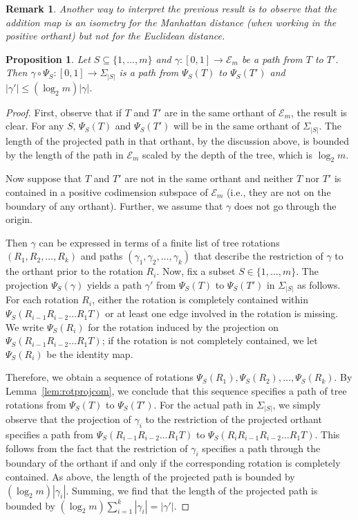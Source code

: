 \documentclass[a4paper,11pt]{article}
\newtheorem{proposition}[theorem]{Proposition}
\newtheorem{remark}[theorem]{Remark}
\newcommand{\aE}{\mathcal{E}}
\begin{document}
\begin{remark}
Another way to interpret the previous result is to observe that the addition map is an isometry for the Manhattan distance (when working in the positive orthant) but not for the Euclidean distance.
\end{remark}

\begin{proposition}\label{prop:projcont}
Let $S \subseteq \{1,\ldots,m\}$ and $\gamma \colon [0,1] \to \aE_m$ be a path from $T$ to $T'$.
Then $\gamma \circ \Psi_S \colon [0,1] \to \Sigma_{|S|}$ is a path from $\Psi_S(T)$ to $\Psi_S(T')$ and $|\gamma'| \leq (\log_2 m) |\gamma|$.
\end{proposition}

\begin{proof}
First, observe that if $T$ and $T'$ are in the same orthant of $\aE_m$, the result is clear. 
For any $S$, $\Psi_S(T)$ and $\Psi_S(T')$ will be in the same orthant of $\Sigma_{|S|}$.
The length of the projected path in that orthant, by the discussion above, is bounded by the length of the path in $\aE_m$ scaled by the depth of the tree, which is $\log_2 m$.

Now suppose that $T$ and $T'$ are not in the same orthant and neither $T$ nor $T'$ is contained in a positive codimension subspace of $\aE_m$ (i.e., they are not on the boundary of any orthant).
Further, we assume that $\gamma$ does not go through the origin.

Then $\gamma$ can be expressed in terms of a finite list of tree rotations $(R_1, R_2, \ldots, R_k)$ and paths $(\gamma_1, \gamma_2, \ldots, \gamma_k)$ that describe the restriction of $\gamma$ to the orthant prior to the rotation $R_i$.
Now, fix a subset $S \in \{1,\ldots,m\}$.
The projection $\Psi_S(\gamma)$ yields a path $\gamma'$ from $\Psi_S(T)$ to $\Psi_S(T')$ in $\Sigma_{|S|}$ as follows.
For each rotation $R_i$, either the rotation is completely contained within $\Psi_S(R_{i-1} R_{i-2} \ldots R_1 T)$ or at least one edge involved in the rotation is missing.
We write $\Psi_S(R_i)$ for the rotation induced by the projection on $\Psi_S(R_{i-1} R_{i-2} \ldots R_1 T)$; if the rotation is not completely contained, we let $\Psi_S(R_i)$ be the identity map.

Therefore, we obtain a sequence of rotations $\Psi_S(R_1), \Psi_S(R_2), \ldots, \Psi_S(R_k)$.
By Lemma~\ref{lem:rotprojcom}, we conclude that this sequence specifies a path of tree rotations from $\Psi_S(T)$ to $\Psi_S(T')$.
For the actual path in $\Sigma_{|S|}$, we simply observe that the projection of $\gamma_i$ to the restriction of the projected orthant specifies a path from $\Psi_S(R_{i-1} R_{i-2} \ldots R_1 T)$ to $\Psi_S(R_i R_{i-1} R_{i-2} \ldots R_1 T)$.
This follows from the fact that the restriction of $\gamma_i$ specifies a path through the boundary of the orthant if and only if the corresponding rotation is completely contained.
As above, the length of the projected path is bounded by $(\log_2 m) |\gamma_i|$.
Summing, we find that the length of the projected path is bounded by $(\log_2 m) \sum_{i=1}^k |\gamma_i| = |\gamma'|$.


\end{proof}
\end{document}
